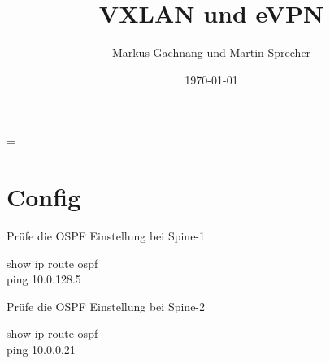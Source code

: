 \documentclass[11pt,titlepage]{article}
\title{VXLAN und eVPN}
\author{Markus Gachnang und Martin Sprecher}
\date{\today{}}
\newenvironment{shadedquotation}
 {\begin{shaded*}
  \quoting[leftmargin=0pt, vskip=0pt]
 }
 {\endquoting
 \end{shaded*}
}
\begin{document}
\sffamily
\maketitle
\newpage
\tableofcontents{}
\setcounter{page}{1}
\newpage
\RaggedRight
\emergencystretch=\maxdimen
{}
\let\SectionOriginal\section
\renewcommand\section[1]{\par\medskip\SectionOriginal{#1}}
\let\SubSectionOriginal\subsection
\renewcommand\subsection[1]{\par\medskip\SubSectionOriginal{#1}}

\section{Config}
\label{sec:Config}
Prüfe die OSPF Einstellung bei Spine-1
\begin{shadedquotation}
	show ip route ospf \\
	ping 10.0.128.5
\end{shadedquotation}
Prüfe die OSPF Einstellung bei Spine-2
\begin{shadedquotation}
	show ip route ospf \\
	ping 10.0.0.21
\end{shadedquotation}
\end{document}
